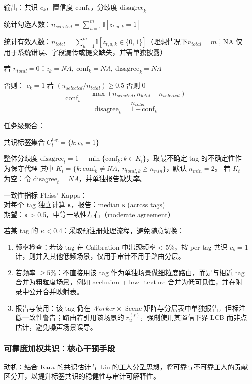 输出：共识 $c_k$，置信度 $\mathrm{conf}_k$，分歧度 $\mathrm{disagree}_k$

统计勾选人数：$n_{selected}=\sum_{u=1}^{m}\mathbb{I}\left[z_{t,u,k}=1\right]$

统计有效人数：$n_{total}=\sum_{u=1}^{m}\mathbb{I}\left[z_{t,u,k}\in\{0,1\}\right]$（理想情况下$n_{total}=m$；NA 仅用于系统错误、字段漏传或提交缺失，并需单独披露）

若 $n_{total}=0$：$c_k=NA,\ \mathrm{conf}_k=NA,\ \mathrm{disagree}_k=NA$

否则：
$c_k=1$ 若 $\left(n_{selected}/n_{total}\right)\geq0.5$ 否则 0
\[\mathrm{conf}_k=\frac{\max\left(n_{selected},n_{total}-n_{selected}\right)}{n_{total}}\]
\[\mathrm{disagree}_k=1-\mathrm{conf}_k\]

任务级聚合：

共识标签集合 $C_t^{\mathrm{tag}}=\{k:c_k=1\}$

整体分歧度 $\mathrm{disagree}_t=1-\min\{\mathrm{conf}_k: k\in K_t\}$，取最不确定 tag 的不确定性作为保守代理
其中 $K_t=\{k:\mathrm{conf}_k\neq NA,\ n_{total,k}\ge n_{min}\}$，默认 $n_{min}=2$。
若 $K_t$ 为空：令 $\mathrm{disagree}_t=NA$，并单独报告缺失率。

一致性指标 Fleiss' Kappa：
\\ 对每个 tag 独立计算 κ，报告：median κ (across tags)
\\ 期望：κ > 0.5，中等一致性左右（moderate agreement）

若某 tag 的 $\kappa<0.4$：采取预注册处理流程，避免随意切换：
\begin{enumerate}
    \item 频率检查：若该 tag 在 Calibration 中出现频率 < 5\%，按 per-tag 共识 $c_k=1$ 计，则并入其他低频场景，仅用于审计不用于路由分层。
    \item 若频率 $\geq5\%$：不直接用该 tag 作为单独场景做细粒度路由，而是与相近 tag 合并为粗粒度场景，例如 occlusion + low\_texture 合并为低可见性，并在附录中公开合并映射表。
    \item 报告与使用：该 tag 仍在 $Worker\times$ Scene 矩阵与分层表中单独报告，但标注低一致性警告；路由若引用该场景的 $r_u^{\left(s\right)}$，强制使用其置信下界 LCB 而非点估计，避免噪声场景误导。
\end{enumerate}

\subsubsection{可靠度加权共识：核心干预手段}\label{sec:method-weighted-consensus}
动机：结合 Kara 的共识估计与 Liu 的工人分型思想，将可靠与不可靠工人的贡献区分开，以提升标签共识的稳健性与审计可解释性。

